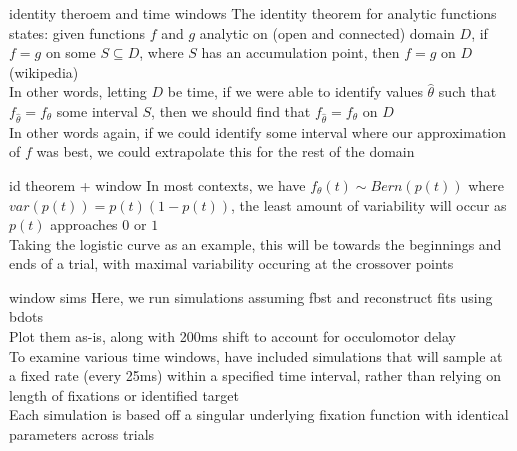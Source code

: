 \documentclass{beamer}
\begin{document}
\begin{frame}{identity theroem and time windows}
The identity theorem for analytic functions states: given functions $f$ and $g$ analytic on (open and connected) domain $D$, if $f = g$ on some $S \subseteq D$, where $S$ has an accumulation point, then $f = g$ on $D$ (wikipedia) \newline \\

In other words, letting $D$ be time, if we were able to identify values $\hat{\theta}$ such that $f_{\hat{\theta}} = f_{\theta}$  some interval $S$, then we should find that $f_{\hat{\theta}} = f_{\theta}$ on $D$ \newline \\

In other words again, if we could identify some interval where our approximation of $f$ was best, we could extrapolate this for the rest of the domain
\end{frame}

\begin{frame}{id theorem + window}
In most contexts, we have $f_{\theta}(t) \sim Bern(p(t))$ where $var(p(t)) = p(t) (1-p(t))$, the least amount of variability will occur as $p(t)$ approaches $0$ or $1$ \newline \\

Taking the logistic curve as an example, this will be towards the beginnings and ends of a trial, with maximal variability occuring at the crossover points
\end{frame}

\begin{frame}{window sims}
Here, we run simulations assuming fbst and reconstruct fits using bdots \newline \\

Plot them as-is, along with 200ms shift to account for occulomotor delay \newline \\

To examine various time windows, have included simulations that will sample at a fixed rate (every 25ms) within a specified time interval, rather than relying on length of fixations or identified target \newline \\

Each simulation is based off a singular underlying fixation function with identical parameters across trials
\end{frame}
\end{document}
